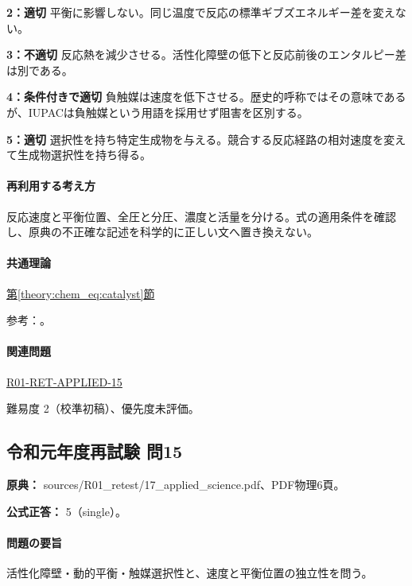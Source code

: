 \noindent\textbf{2：適切} 平衡に影響しない。同じ温度で反応の標準ギブズエネルギー差を変えない。\par

\noindent\textbf{3：不適切} 反応熱を減少させる。活性化障壁の低下と反応前後のエンタルピー差は別である。\par

\noindent\textbf{4：条件付きで適切} 負触媒は速度を低下させる。歴史的呼称ではその意味であるが、IUPACは負触媒という用語を採用せず阻害を区別する。\par

\noindent\textbf{5：適切} 選択性を持ち特定生成物を与える。競合する反応経路の相対速度を変えて生成物選択性を持ち得る。\par

\paragraph{再利用する考え方} 反応速度と平衡位置、全圧と分圧、濃度と活量を分ける。式の適用条件を確認し、原典の不正確な記述を科学的に正しい文へ置き換えない。

\paragraph{共通理論} \hyperref[theory:chem_eq:catalyst]{第\ref*{theory:chem_eq:catalyst}節}

\par 参考：\cite{iupac_greenbook2012,iupac_catalyst}。

\paragraph{関連問題} \hyperref[q:r01-ret-applied-15]{R01-RET-APPLIED-15}

\par 難易度 2（校準初稿）、優先度未評価。

\subsection{令和元年度再試験 問15}
\label{q:r01-ret-applied-15}

\noindent\textbf{原典：} sources/R01\_retest/17\_applied\_science.pdf、PDF物理6頁。

\textbf{公式正答：} 5（single）。

\paragraph{問題の要旨} 活性化障壁・動的平衡・触媒選択性と、速度と平衡位置の独立性を問う。

